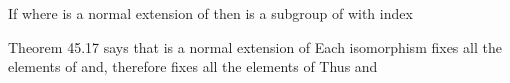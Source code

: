 \documentclass[11pt,oneside]{article}
\begin{document}
\begin{BookBody}
 If  where  is a normal extension of  then  is a subgroup of  with index 

 Theorem 45.17 says that  is a normal extension of  Each isomorphism  fixes all the elements of  and, therefore\BookInline{,\allowbreak \sigma } fixes all the elements of  Thus \BookInline{\sigma \in }  and 

\end{BookBody}

\BookNarrativetrue
\end{document}
